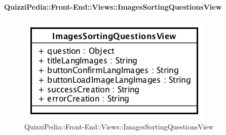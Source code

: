 \paragraph{QuizziPedia::Front-End::Views::ImagesSortingQuestionsView}
\begin{figure} [ht]
	\centering
	\includegraphics[scale=0.80]{UML/Classi/Front-End/QuizziPedia_Front-end_Views_ImagesSortingQuestionsView.png}
	\caption{QuizziPedia::Front-End::Views::ImagesSortingQuestionsView}
\end{figure} \FloatBarrier
